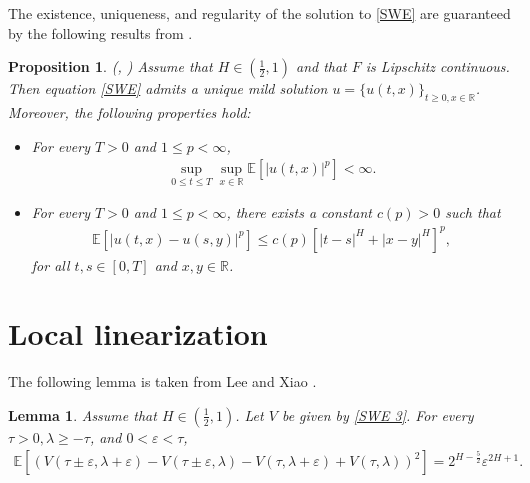 \documentclass[11pt,reqno]{amsart}
\numberwithin{equation}{section}
\newtheorem{lemma}{Lemma}[section]
\newtheorem{proposition}[theorem]{Proposition}
\newcommand{\E}{\mathbb E}
\newcommand{\1}{{\bf 1}}
\newcommand{\2}{{\bf 2}}
\begin{document}
The existence, uniqueness, and regularity of the solution to \eqref{SWE} are guaranteed by the following results from \cite{D99, DS15}.   
\begin{proposition}\label{prop solution Holder}(\cite[Theorem 13]{D99},  \cite[Section 2.1]{DS15}) Assume that $H\in (\frac12, 1)$ and that $F$ is  Lipschitz continuous.  Then equation \eqref{SWE} admits  a unique mild solution $u=\{u(t,x)\}_{t\ge0, x\in \mathbb R}$.  Moreover, the following properties hold:
\begin{itemize}
 \item[(a)] For every  $T>0$ and  $1 \le p<\infty$,  
\begin{align}\label{eq moment bound}
\sup_{0\le t\le T}\sup_{x\in \mathbb R}\mathbb E\left[|u(t,x)|^p\right]<\infty. 
\end{align}
 
\item[(b)] For every  $T>0$  and $1 \le p<\infty$,  there exists a constant $c(p)>0$ such that 
\begin{align}\label{eq Holder}
\mathbb E\left[\left|u(t, x)-u(s, y)\right|^p \right]\le c(p)\left[|t-s|^{H}+|x-y|^{H} \right] ^{p},
\end{align}
for all $t, s\in [0,T]$ and $x, y\in \mathbb R$. 
\end{itemize}
  \end{proposition}
 
  
 


\section{Local linearization}\label{sec proof}
  
    The following   lemma  is taken from Lee and Xiao \cite{LX2022}.
   \begin{lemma}\label{Lem2}\cite[Lemmas 2.3 and 2.4]{LX2022}  Assume that $H\in \left(\frac12, 1\right)$.   Let $V$ be given by \eqref{SWE 3}.  
     For every $\tau>0, \lambda \ge-\tau$, and  $0 < \varepsilon< \tau$,  
\begin{equation}\label{Eq:rec-inc}
\begin{split}
 \mathbb E\left[\left(V(\tau\pm\varepsilon, \lambda + \varepsilon) - V(\tau\pm \varepsilon, \lambda) -V(\tau, \lambda + \varepsilon) + V(\tau, \lambda)\right)^2\right] 
  =  2^{H-\frac{5}{2}}\varepsilon^{2H+1}.
\end{split}
\end{equation}
\end{lemma}
  
\end{document}
